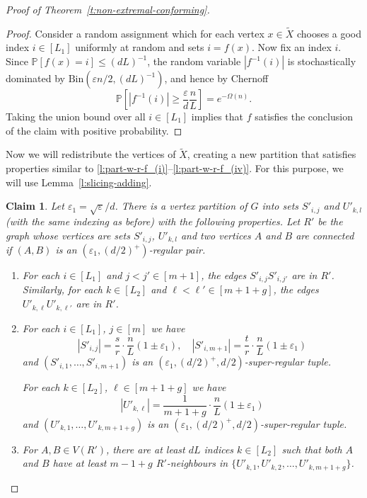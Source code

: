 \documentclass[reqno, 12pt]{amsart}
\numberwithin{equation}{section}
\numberwithin{figure}{section}
\theoremstyle{plain}
\newtheorem{claim}[thm]{Claim}
\theoremstyle{definition}
\let\eps=\varepsilon
\newcommand{\Bin}{\textrm{Bin}}
\newcommand{\pr}[1]{\mathbb{P} \left[ #1 \right]}
\begin{document}
\begin{proof}[Proof of Theorem~\ref{t:non-extremal-conforming}]
    \begin{proof}
        Consider a random assignment which for each vertex $x\in \tilde X$ chooses a good index $i\in[L_1]$ uniformly at random and sets $i = f(x)$. Now fix an index $i$. Since $\pr{f(x) = i} \leq (dL)^{-1}$, the random variable $|f^{-1}(i)|$ is stochastically dominated by $\Bin(\eps n/2, (dL)^{-1})$, and hence by Chernoff
        $$\pr{|f^{-1}(i)| \geq \frac{\eps}{d}\frac{n}{L}} = e^{-\Omega(n)}.$$ 
        Taking the union bound over all $i\in[L_1]$ implies that $f$ satisfies the conclusion of the claim with positive probability.
    \end{proof}

    Now we will redistribute the vertices of $\tilde X$, creating a new partition that satisfies properties similar to \ref{l:part-w-r-f_(i)}--\ref{l:part-w-r-f_(iv)}. For this purpose, we will use Lemma~\ref{l:slicing-adding}. 

    \begin{claim}
        Let $\eps_1= \sqrt \eps / d$. There is a vertex partition of $G$ into sets $S'_{i,j}$ and $U'_{k,l}$ (with the same indexing as before) with the following properties. Let $R'$ be the graph whose vertices are sets $S'_{i,j}$, $U'_{k,l}$ and two vertices $A$ and $B$ are connected if $(A,B)$ is an $\left(\eps_1,\left(d/2\right)^+\right)$-regular pair.
        \begin{enumerate}[label=(\roman*')]
            \item\label{claim_(i)} For each $i \in [L_1]$ and $j < j' \in [m+1]$, the edges $S'_{i,j}S'_{i,j'}$ are in $R'$. Similarly, for each $k\in [L_2]$ and $\ell < \ell' \in [m+1+g]$, the edges $U'_{k,\ell}U'_{k,\ell'}$ are in $R'$.
            
            \item\label{claim_(ii)} For each $i \in [L_1]$, $j\in[m]$ we have 
            $$|S'_{i,j}| = \frac{s}{r}\cdot\frac{n}{L}(1\pm \eps_1),\quad |S'_{i,m+1}| = \frac{t}{r}\cdot\frac{n}{L}(1\pm \eps_1)$$
            and $(S'_{i,1},\dots, S'_{i,m+1})$ is an $\left(\eps_1,\left(d/2\right)^+,d/2\right)$-super-regular tuple.
            
            \noindent
            For each $k \in [L_2]$, $\ell\in[m+1+g]$ we have 
            $$|U'_{k,\ell}|=\frac {1}{m+1+g}\cdot\frac{n}{L}(1 \pm \eps_1)$$
            and $(U'_{k,1},\dots, U'_{k,m+1+g})$ is an $\left(\eps_1,\left(d/2\right)^+,d/2\right)$-super-regular tuple.
            
            \item\label{claim_(iii)}  For $A, B \in V(R')$, there are at least $d L$ indices $k \in [L_2]$ such that both $A$ and $B$ have at least $m-1+g$ $R'$-neighbours in $\{U'_{k,1}, U'_{k,2}, \ldots, U'_{k,m+1+g}\}$.
            

\end{enumerate}
\end{claim}
\end{proof}
\end{document}

